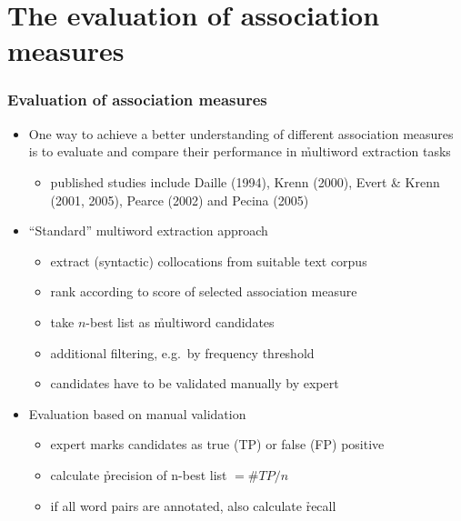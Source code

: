\documentclass[t]{beamer} %
\begin{document}
\section{The evaluation of association measures}

\begin{frame}
  \frametitle{Evaluation of association measures}

  \begin{itemize}
  \item One way to achieve a better understanding of different association
    measures is to evaluate and compare their performance in \h{multiword
      extraction} tasks
    \begin{itemize}
    \item published studies include Daille (1994), Krenn (2000), Evert \&
      Krenn (2001, 2005), Pearce (2002) and Pecina (2005)
    \end{itemize}
    \pause
  \item ``Standard'' multiword extraction approach
    \begin{itemize}
    \item extract (syntactic) collocations from suitable text corpus
    \item rank according to score of selected association measure
    \item take $n$-best list as \h{multiword candidates}
    \item additional filtering, e.g.\ by frequency threshold
    \item candidates have to be validated manually by expert
    \end{itemize}
    \pause
  \item Evaluation based on manual validation
    \begin{itemize}
    \item expert marks candidates as true (TP) or false (FP) positive
    \item calculate \h{precision} of n-best list $= \#TP / n$
    \item if all word pairs are annotated, also calculate \h{recall}
    \end{itemize}
  \end{itemize}
\end{frame}
\end{document}
